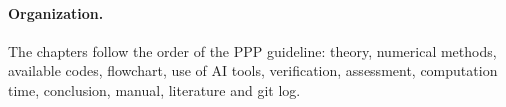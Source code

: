 \paragraph{Organization.} The chapters follow the order of the PPP
guideline: theory, numerical methods, available codes, flowchart, use of AI tools,
verification, assessment, computation time, conclusion, manual, literature and
git log.
